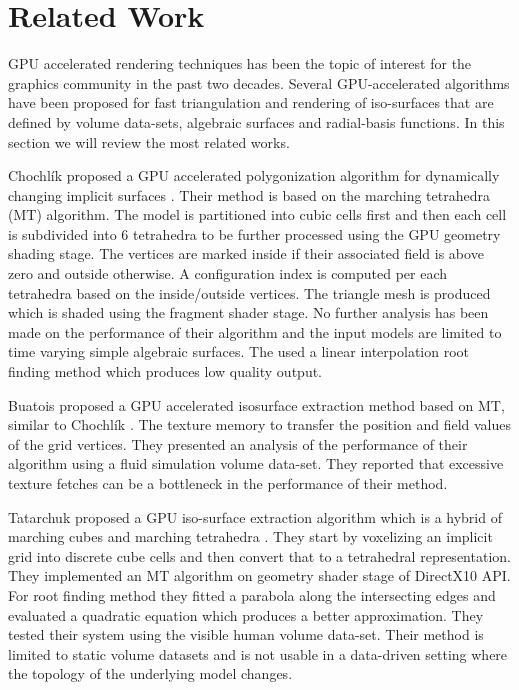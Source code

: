 \section{Related Work}
GPU accelerated rendering techniques has been the topic of interest for the graphics community in the past two decades.
Several GPU-accelerated algorithms have been proposed for fast triangulation and rendering of iso-surfaces that are defined by
volume data-sets, algebraic surfaces and radial-basis functions. In this section we will review the most related works.

Chochl{\'i}k \etal proposed a GPU accelerated polygonization algorithm for dynamically changing implicit surfaces \cite{chochlik2012gpu}. 
Their method is based on the marching tetrahedra (MT) algorithm. The model is partitioned into cubic cells first and then each cell is 
subdivided into 6 tetrahedra to be further processed using the GPU geometry shading stage. The vertices are marked inside if their 
associated field is above zero and outside otherwise. A configuration index is computed per each tetrahedra based on the inside/outside 
vertices. The triangle mesh is produced which is shaded using the fragment shader stage. No further analysis has been made on the performance 
of their algorithm and the input models are limited to time varying simple algebraic surfaces. The used a linear interpolation root finding
method which produces low quality output. 

Buatois \etal proposed a GPU accelerated isosurface extraction method based on MT, similar to Chochl{\'i}k \etal \cite{Buatois2006}. The 
texture memory to transfer the position and field values of the grid vertices. They presented an analysis of the performance of their algorithm
using a fluid simulation volume data-set. They reported that excessive texture fetches can be a bottleneck in the performance of their method.


Tatarchuk \etal proposed a GPU iso-surface extraction algorithm which is a hybrid of marching cubes and marching tetrahedra \cite{Tatarchuk2007}. 
They start by voxelizing an implicit grid into discrete cube cells and then convert that to a tetrahedral representation. They implemented an MT 
algorithm on geometry shader stage of DirectX10 API. For root finding method they fitted a parabola along the intersecting edges and evaluated a 
quadratic equation which produces a better approximation. They tested their system using the visible human volume data-set. Their method
is limited to static volume datasets and is not usable in a data-driven setting where the topology of the underlying model changes. 

